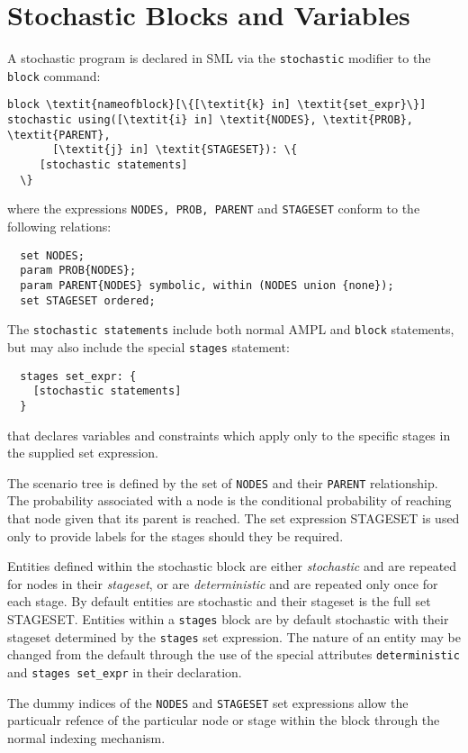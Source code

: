 \documentclass[10pt,a4paper]{book}
\begin{document}
\section{Stochastic Blocks and Variables}
A stochastic program is declared in SML via the {\tt stochastic} modifier
to the {\tt block} command:
\begin{Verbatim}[commandchars=\\\{\}]
  block \textit{nameofblock}[\{[\textit{k} in] \textit{set_expr}\}] stochastic using([\textit{i} in] \textit{NODES}, \textit{PROB}, \textit{PARENT}, 
       [\textit{j} in] \textit{STAGESET}): \{
     [stochastic statements]
  \}
\end{Verbatim}
where the expressions {\tt NODES, PROB, PARENT} and {\tt STAGESET} conform to
the following relations:
\begin{verbatim}
  set NODES; 
  param PROB{NODES};
  param PARENT{NODES} symbolic, within (NODES union {none});
  set STAGESET ordered;  
\end{verbatim}
The {\tt stochastic statements} include both normal AMPL and {\tt block}
statements, but may also include the special {\tt stages} statement:
\begin{verbatim}
  stages set_expr: {
    [stochastic statements]
  }
\end{verbatim}
that declares variables and constraints which apply only to the specific stages
in the supplied set expression.

The scenario tree is defined by the set of {\tt NODES} and their {\tt PARENT}
relationship. The probability associated with a node is the conditional
probability of reaching that node given that its parent is reached. The
set expression STAGESET is used only to provide labels for the stages should
they be required.

Entities defined within the stochastic block are either {\it stochastic} and
are repeated for nodes in their {\it stageset}, or are {\it deterministic} and
are repeated only once for each stage. By default entities are stochastic
and their stageset is the full set STAGESET. Entities within a {\tt stages}
block are by default stochastic with their stageset determined by the
{\tt stages} set expression.
The nature of an entity may be changed from the default through the use of the
special attributes {\tt deterministic} and {\tt stages set\_expr} in their
declaration.

The dummy indices of the {\tt NODES} and {\tt STAGESET} set expressions allow
the particualr refence of the particular node or stage within the block through
the normal indexing mechanism.
\end{document}

